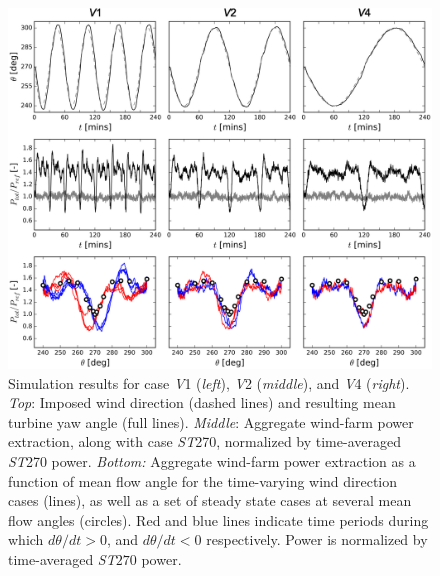 		
		\begin{figure}[ht]
			\centering
			\includegraphics[width=\textwidth]{chapters/turbulent_inflow/blm/figure12.eps}
			\caption[Simulation results for case \emph{V}1, \emph{V}2, and \emph{V}4.]{Simulation results for case \emph{V}1 (\emph{left}), \emph{V}2 (\emph{middle}), and \emph{V}4 (\emph{right}). \emph{Top}: Imposed wind direction (dashed lines) and resulting mean turbine yaw angle (full lines). \emph{Middle}: Aggregate wind-farm power extraction, along with case \emph{ST}270, normalized by time-averaged \emph{ST}270 power. \emph{Bottom:} Aggregate wind-farm power extraction as a function of mean flow angle for the time-varying wind direction cases (lines), as well as a set of steady state cases at several mean flow angles (circles). Red and blue lines indicate time periods during which $d\theta/dt > 0 $, and $d\theta/dt < 0$ respectively. Power is normalized by time-averaged \emph{ST}$270$ power.}
			\label{fig:timeyaw_timepower}
		\end{figure}
		
